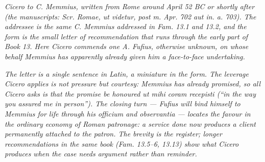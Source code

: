 
\textit{Cicero to C. Memmius, written from Rome around
April 52 BC or shortly after (the manuscripts:
\textit{Scr. Romae, ut videtur, post m. Apr. 702 aut
in. a. 703}). The addressee is the same C. Memmius
addressed in \textit{Fam.} 13.1 and 13.2, and the form
is the small letter of recommendation that runs through
the early part of Book 13. Here Cicero commends one
A. Fufius, otherwise unknown, on whose behalf Memmius
has apparently already given him a face-to-face
undertaking.}

\textit{The letter is a single sentence in Latin, a
miniature in the form. The leverage Cicero applies is
not pressure but courtesy: Memmius has already
promised, so all Cicero asks is that the promise be
honoured \textit{ut mihi coram recepisti} (``in the way
you assured me in person''). The closing turn ---
Fufius will bind himself to Memmius for life through
his \textit{officium} and \textit{observantia} ---
locates the favour in the ordinary economy of Roman
patronage: a service done now produces a client
permanently attached to the patron. The brevity is the
register; longer recommendations in the same book
(\textit{Fam.} 13.5--6, 13.13) show what Cicero produces
when the case needs argument rather than reminder.}
